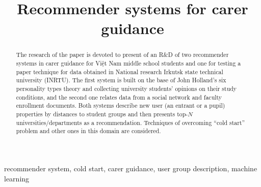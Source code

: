 \documentclass[conference,a4]{IEEEtran}
\begin{document}

\title{Recommender systems for carer guidance}

\author{%
}

\newcommand{\irnitu}{INRTU}
\newcommand{\inrtu}{INRTU}

\maketitle
\begin{abstract}
  The research of the paper is devoted to present of an R\&D of two recommender systems in carer guidance for Việt Nam middle school students and one for testing a paper \cite{tomsk} technique for data obtained in National research Irkutsk state technical university (\irnitu).  The first system is built on the base of John Holland's six personality types theory and collecting university students' opinions on their study conditions, and the second one relates data from a social network and faculty enrollment documents.  Both systems describe new user (an entrant or a pupil) properties by distances to student groups and then presents top-$N$ universities/departments as a recommendation.  Techniques of overcoming ``cold start'' problem and other ones in this domain are considered.

\end{abstract}

\begin{IEEEkeywords}
recommender system, cold start, carer guidance, user group description, machine learning
\end{IEEEkeywords}
\end{document}
